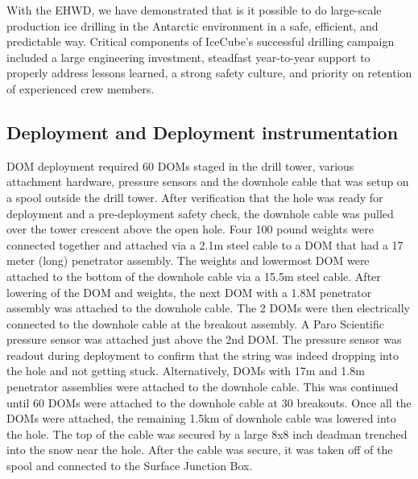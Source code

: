 
With the EHWD, we have demonstrated that is it possible to do large-scale production ice drilling in the Antarctic environment in a safe, efficient, and predictable way.  Critical components of IceCube’s successful drilling campaign included a large engineering investment, steadfast year-to-year support to properly address lessons learned, a strong safety culture, and priority on retention of experienced crew members.

\subsection{\label{sec:deployment_inst}Deployment and Deployment instrumentation}

DOM deployment required 60 DOMs staged in the drill tower, various attachment hardware, pressure sensors and the downhole cable that was setup on a spool outside the drill tower. After verification that the hole was ready for deployment and a pre-deployment safety check, the downhole cable was pulled over the tower crescent above the open hole. Four 100 pound weights were connected together and attached via a 2.1m steel cable to a DOM that had a 17 meter (long) penetrator assembly. The weights and lowermost DOM were attached to the bottom of the downhole cable via a 15.5m steel cable. After lowering of the DOM and weights, the next DOM with a 1.8M penetrator assembly was attached to the downhole cable. The 2 DOMs were then electrically connected to the downhole cable at the breakout assembly. A Paro Scientific pressure sensor was attached just above the 2nd DOM. The pressure sensor was readout during deployment to confirm that the string was indeed dropping into the hole and not getting stuck. Alternatively, DOMs with 17m and 1.8m penetrator assemblies were attached to the downhole cable. This was continued until 60 DOMs were attached to the downhole cable at 30 breakouts. Once all the DOMs were attached, the remaining 1.5km of downhole cable was lowered into the hole. The top of the cable was secured by a large 8x8 inch deadman trenched into the snow near the hole. After the cable was secure, it was taken off of the spool and connected to the Surface Junction Box.

